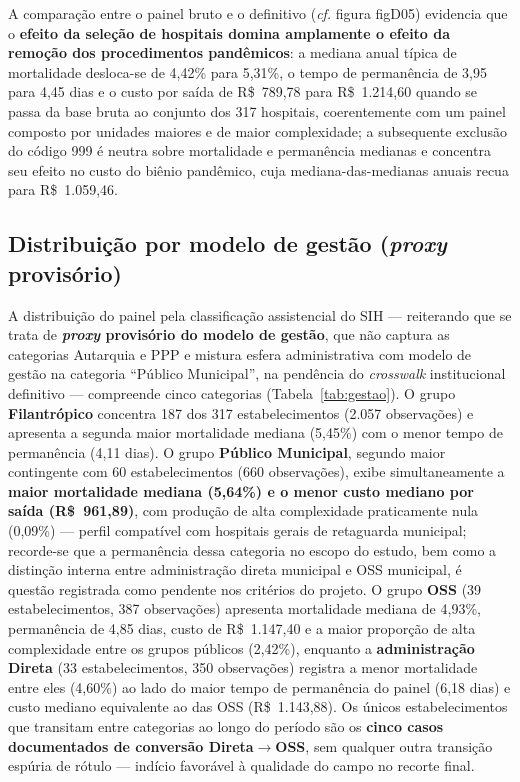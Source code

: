 A comparação entre o painel bruto e o definitivo (\emph{cf.} figura figD05) evidencia que o \textbf{efeito da seleção de hospitais domina amplamente o efeito da remoção dos procedimentos pandêmicos}: a mediana anual típica de mortalidade desloca-se de 4,42\% para 5,31\%, o tempo de permanência de 3,95 para 4,45 dias e o custo por saída de R\$~789,78 para R\$~1.214,60 quando se passa da base bruta ao conjunto dos 317 hospitais, coerentemente com um painel composto por unidades maiores e de maior complexidade; a subsequente exclusão do código 999 é neutra sobre mortalidade e permanência medianas e concentra seu efeito no custo do biênio pandêmico, cuja mediana-das-medianas anuais recua para R\$~1.059,46.

\subsection*{Distribuição por modelo de gestão (\emph{proxy} provisório)}

A distribuição do painel pela classificação assistencial do SIH --- reiterando que se trata de \textbf{\emph{proxy} provisório do modelo de gestão}, que não captura as categorias Autarquia e PPP e mistura esfera administrativa com modelo de gestão na categoria ``Público Municipal'', na pendência do \emph{crosswalk} institucional definitivo --- compreende cinco categorias (Tabela~\ref{tab:gestao}). O grupo \textbf{Filantrópico} concentra 187 dos 317 estabelecimentos (2.057 observações) e apresenta a segunda maior mortalidade mediana (5,45\%) com o menor tempo de permanência (4,11 dias). O grupo \textbf{Público Municipal}, segundo maior contingente com 60 estabelecimentos (660 observações), exibe simultaneamente a \textbf{maior mortalidade mediana (5,64\%) e o menor custo mediano por saída (R\$~961,89)}, com produção de alta complexidade praticamente nula (0,09\%) --- perfil compatível com hospitais gerais de retaguarda municipal; recorde-se que a permanência dessa categoria no escopo do estudo, bem como a distinção interna entre administração direta municipal e OSS municipal, é questão registrada como pendente nos critérios do projeto. O grupo \textbf{OSS} (39 estabelecimentos, 387 observações) apresenta mortalidade mediana de 4,93\%, permanência de 4,85 dias, custo de R\$~1.147,40 e a maior proporção de alta complexidade entre os grupos públicos (2,42\%), enquanto a \textbf{administração Direta} (33 estabelecimentos, 350 observações) registra a menor mortalidade entre eles (4,60\%) ao lado do maior tempo de permanência do painel (6,18 dias) e custo mediano equivalente ao das OSS (R\$~1.143,88). Os únicos estabelecimentos que transitam entre categorias ao longo do período são os \textbf{cinco casos documentados de conversão Direta$\to$OSS}, sem qualquer outra transição espúria de rótulo --- indício favorável à qualidade do campo no recorte final.

